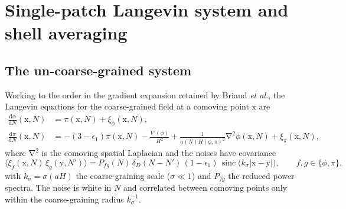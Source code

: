 \documentclass[a4paper,11pt]{article}
\newcommand{\etal}{\emph{et al.}}
\renewcommand{\d}{\mathrm{d}}
\newcommand{\vect}[1]{\bm{\mathrm{{#1}}}}
\DeclareMathOperator{\grad}{\nabla}
\DeclareMathOperator{\sinc}{sinc}
\newcommand{\Ny}{N}                          %
\newcommand{\epsSR}{\epsilon_1}              %
\newcommand{\Hub}{H}                         %
\newcommand{\sfactor}{a}                     %
\newcommand{\atloc}{(\field,\mom)}           %
\newcommand{\field}{\phi}                    %
\newcommand{\mom}{\pi}                       %
\newcommand{\Vpot}{V}                        %
\newcommand{\noise}[1]{\xi_{#1}}             %
\newcommand{\aH}[1][]{(\sfactor \Hub)#1}     %
\newcommand{\aHloc}{\sfactor(\Ny)\Hub\atloc} %
\newcommand{\Pspec}[1]{P_{#1}}               %
\begin{document}
\section{Single-patch Langevin system and shell averaging}
\label{sec:shell-averaging}

\subsection{The un-coarse-grained system}

Working to the order in the gradient expansion retained by Briaud \etal,
the Langevin equations for the coarse-grained field at a comoving point
$\vect{x}$ are
\begin{subequations}
\label{eq:patch-langevin}
\begin{align}
    \frac{\d \field}{\d \Ny}(\vect{x}, \Ny)
    & =
    \mom(\vect{x}, \Ny) + \noise{\field}(\vect{x}, \Ny) ,
    \\
    \frac{\d \mom}{\d \Ny}(\vect{x}, \Ny)
    & =
    -(3-\epsSR) \mom(\vect{x},\Ny)
    - \frac{\Vpot'(\field)}{\Hub^2}
    + \frac{1}{\aHloc^2} \grad^2 \field(\vect{x}, \Ny)
    + \noise{\mom}(\vect{x}, \Ny) ,
\end{align}
\end{subequations}
where $\grad^2$ is the comoving spatial Laplacian and the noises have
covariance
\begin{equation}
    \big\langle \noise{f}(\vect{x}, \Ny) \, \noise{g}(\vect{y}, \Ny') \big\rangle
    =
    \Pspec{fg}(\Ny) \, \delta_D(\Ny - \Ny') \, (1-\epsSR) \,
    \sinc\!\big( k_\sigma |\vect{x}-\vect{y}| \big) ,
    \qquad f, g \in \{\field, \mom\} ,
    \label{eq:noise-covariance}
\end{equation}
with $k_\sigma = \sigma \aH$ the coarse-graining scale ($\sigma \ll 1$) and
$\Pspec{fg}$ the reduced power spectra. The noise is white in $\Ny$ and
correlated between comoving points only within the coarse-graining radius
$k_\sigma^{-1}$.
\end{document}
